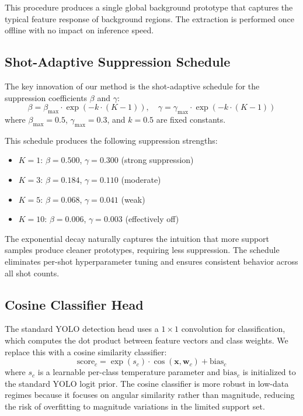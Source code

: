 \documentclass[10pt,twocolumn,letterpaper]{article}
\begin{document}
This procedure produces a single global background prototype that captures the
typical feature response of background regions. The extraction is performed once
offline with no impact on inference speed.

\subsection{Shot-Adaptive Suppression Schedule}

The key innovation of our method is the shot-adaptive schedule for the suppression
coefficients $\beta$ and $\gamma$:
\begin{equation}
\label{eq:schedule}
\beta = \beta_{\max} \cdot \exp(-k \cdot (K-1)), \quad
\gamma = \gamma_{\max} \cdot \exp(-k \cdot (K-1))
\end{equation}
where $\beta_{\max}=0.5$, $\gamma_{\max}=0.3$, and $k=0.5$ are fixed constants.

This schedule produces the following suppression strengths:
\begin{itemize}
    \item $K=1$: $\beta=0.500$, $\gamma=0.300$ (strong suppression)
    \item $K=3$: $\beta=0.184$, $\gamma=0.110$ (moderate)
    \item $K=5$: $\beta=0.068$, $\gamma=0.041$ (weak)
    \item $K=10$: $\beta=0.006$, $\gamma=0.003$ (effectively off)
\end{itemize}

The exponential decay naturally captures the intuition that more support samples
produce cleaner prototypes, requiring less suppression. The schedule eliminates
per-shot hyperparameter tuning and ensures consistent behavior across all shot counts.

\subsection{Cosine Classifier Head}

The standard YOLO detection head uses a $1\times 1$ convolution for classification,
which computes the dot product between feature vectors and class weights.
We replace this with a cosine similarity classifier:
\begin{equation}
\label{eq:cosine}
\text{score}_c = \exp(s_c) \cdot \cos(\mathbf{x}, \mathbf{w}_c) + \text{bias}_c
\end{equation}
where $s_c$ is a learnable per-class temperature parameter and $\text{bias}_c$ is
initialized to the standard YOLO logit prior. The cosine classifier is more robust
in low-data regimes because it focuses on angular similarity rather than magnitude,
reducing the risk of overfitting to magnitude variations in the limited support set.
\end{document}
